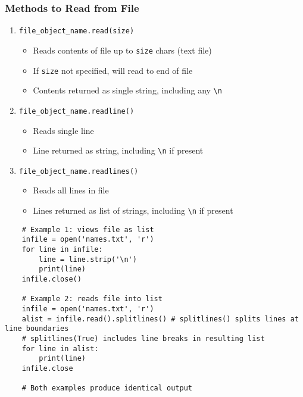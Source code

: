 \documentclass{article}
\begin{document}
\subsubsection{Methods to Read from File}
    \begin{multicols}{2}
        \begin{enumerate}
            \item \texttt{file\_object\_name.read(size)}
                \begin{itemize}
                    \item Reads contents of file up to \texttt{size} chars (text file)
                    \item If \texttt{size} not specified, will read to end of file
                    \item Contents returned as single string, including any \texttt{\textbackslash n}
                \end{itemize}
            \item \texttt{file\_object\_name.readline()}
                \begin{itemize}
                    \item Reads single line
                    \item Line returned as string, including \texttt{\textbackslash n} if present
                \end{itemize}
            \item \texttt{file\_object\_name.readlines()}
                \begin{itemize}
                    \item Reads all lines in file
                    \item Lines returned as list of strings, including \texttt{\textbackslash n} if present
                \end{itemize}
        \end{enumerate}
    \end{multicols}
\vspace{-1em}
\begin{lstlisting}
    # Example 1: views file as list
    infile = open('names.txt', 'r')
    for line in infile:
        line = line.strip('\n')
        print(line)
    infile.close()

    # Example 2: reads file into list
    infile = open('names.txt', 'r')
    alist = infile.read().splitlines() # splitlines() splits lines at line boundaries
    # splitlines(True) includes line breaks in resulting list
    for line in alist:
        print(line)
    infile.close

    # Both examples produce identical output
\end{lstlisting}
\end{document}
